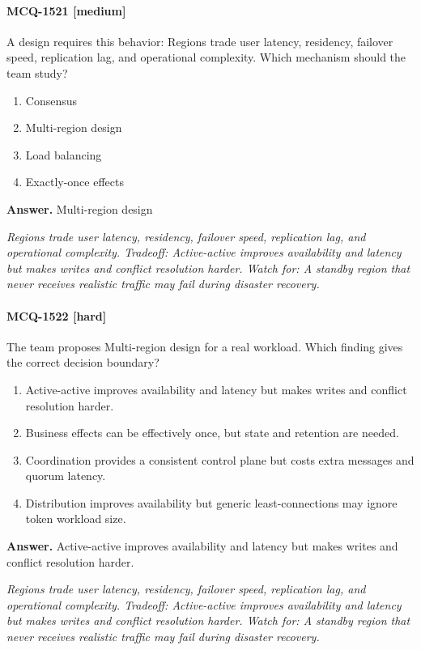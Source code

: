 \paragraph{MCQ-1521 [medium]} A design requires this behavior: Regions trade user latency, residency, failover speed, replication lag, and operational complexity. Which mechanism should the team study?
\begin{enumerate}[label=\Alph*.]
\item Consensus
\item Multi-region design
\item Load balancing
\item Exactly-once effects
\end{enumerate}
\noindent\textbf{Answer.} Multi-region design
\par\textit{Regions trade user latency, residency, failover speed, replication lag, and operational complexity. Tradeoff: Active-active improves availability and latency but makes writes and conflict resolution harder. Watch for: A standby region that never receives realistic traffic may fail during disaster recovery.}
\paragraph{MCQ-1522 [hard]} The team proposes Multi-region design for a real workload. Which finding gives the correct decision boundary?
\begin{enumerate}[label=\Alph*.]
\item Active-active improves availability and latency but makes writes and conflict resolution harder.
\item Business effects can be effectively once, but state and retention are needed.
\item Coordination provides a consistent control plane but costs extra messages and quorum latency.
\item Distribution improves availability but generic least-connections may ignore token workload size.
\end{enumerate}
\noindent\textbf{Answer.} Active-active improves availability and latency but makes writes and conflict resolution harder.
\par\textit{Regions trade user latency, residency, failover speed, replication lag, and operational complexity. Tradeoff: Active-active improves availability and latency but makes writes and conflict resolution harder. Watch for: A standby region that never receives realistic traffic may fail during disaster recovery.}
